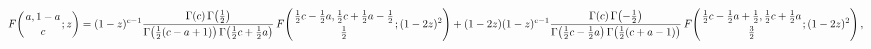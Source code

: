 \[\mathop{F\/}\nolimits\!\left({a,1-a\atop c};z\right)=(1-z)^{c-1}\frac{\mathop{%
\Gamma\/}\nolimits\!\left(c\right)\mathop{\Gamma\/}\nolimits\!\left(\tfrac{1}{%
2}\right)}{\mathop{\Gamma\/}\nolimits\!\left(\tfrac{1}{2}(c-a+1)\right)\mathop%
{\Gamma\/}\nolimits\!\left(\tfrac{1}{2}c+\tfrac{1}{2}a\right)}\mathop{F\/}%
\nolimits\!\left({\tfrac{1}{2}c-\tfrac{1}{2}a,\tfrac{1}{2}c+\tfrac{1}{2}a-%
\tfrac{1}{2}\atop\tfrac{1}{2}};(1-2z)^{2}\right)+(1-2z)(1-z)^{c-1}\frac{%
\mathop{\Gamma\/}\nolimits\!\left(c\right)\mathop{\Gamma\/}\nolimits\!\left(-%
\tfrac{1}{2}\right)}{\mathop{\Gamma\/}\nolimits\!\left(\tfrac{1}{2}c-\tfrac{1}%
{2}a\right)\mathop{\Gamma\/}\nolimits\!\left(\tfrac{1}{2}(c+a-1)\right)}%
\mathop{F\/}\nolimits\!\left({\tfrac{1}{2}c-\tfrac{1}{2}a+\tfrac{1}{2},\tfrac{%
1}{2}c+\tfrac{1}{2}a\atop\tfrac{3}{2}};(1-2z)^{2}\right),\]